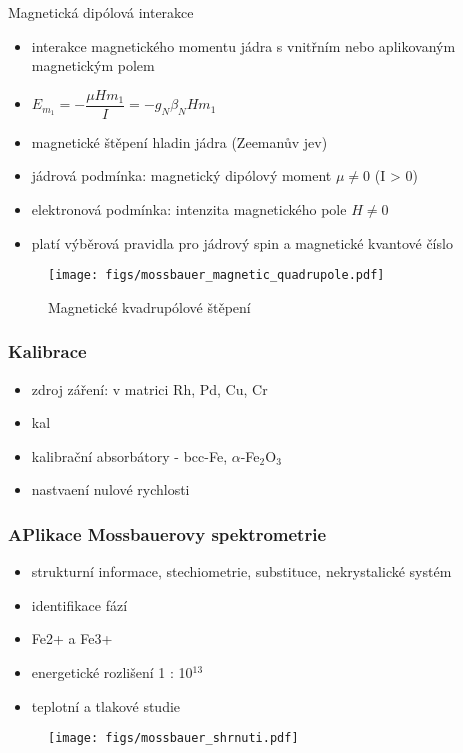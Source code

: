 \vspace{1 cm}
Magnetická dipólová interakce
\begin{itemize}
   \item interakce magnetického momentu jádra s vnitřním nebo aplikovaným magnetickým polem
   \item $E_{m_1} = - \dfrac{\mu H m_1}{I} = - g_N \beta_N H m_1$
   \item magnetické štěpení hladin jádra (Zeemanův jev)
   \item jádrová podmínka: magnetický dipólový moment $\mu \neq 0$ (I > 0)
   \item elektronová podmínka: intenzita magnetického pole $H \neq 0$
   \item platí výběrová pravidla pro jádrový spin a magnetické kvantové číslo
\end{itemize}
\begin{figure}[ht!]
   \centering
   \texttt{[image: figs/mossbauer\_magnetic\_quadrupole.pdf]}
   \caption{Magnetické kvadrupólové štěpení}
   \label{fig:6_2_mossbauer_magnetic_quadrupole}
\end{figure}



\subsubsection{Kalibrace}
\begin{itemize}
   \item zdroj záření:  v matrici Rh, Pd, Cu, Cr
   \item kal%
   \item kalibrační absorbátory - bcc-Fe, $\alpha$-Fe$_2$O$_3$
   \item nastvaení nulové rychlosti
\end{itemize}
\subsubsection{APlikace Mossbauerovy spektrometrie}

\begin{itemize}
   \item strukturní informace, stechiometrie, substituce, nekrystalické systém
   \item identifikace fází
   \item Fe2+ a Fe3+
   \item energetické rozlišení 1 : 10$^{13}$
   \item teplotní a tlakové studie
\end{itemize}
\begin{figure}[ht!]
   \centering
   \texttt{[image: figs/mossbauer\_shrnuti.pdf]}
\end{figure}


